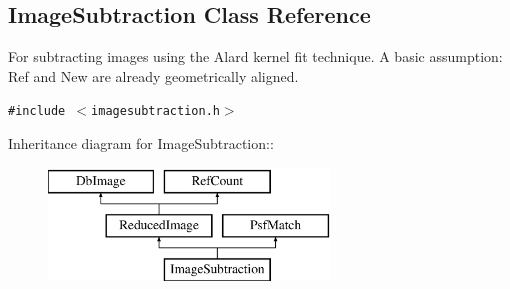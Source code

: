 \subsection{Image\-Subtraction  Class Reference}
\label{class_imagesubtraction}
For subtracting images using the Alard kernel fit technique. A basic assumption: Ref and New are already geometrically aligned. 


{\tt \#include $<$imagesubtraction.h$>$}

Inheritance diagram for Image\-Subtraction::\begin{figure}[H]
\begin{center}
\leavevmode
\includegraphics[height=3cm]{class_imagesubtraction}
\end{center}
\end{figure}
